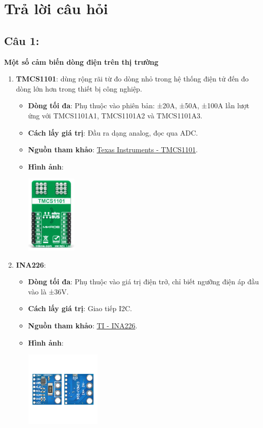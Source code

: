 \section{Trả lời câu hỏi}
\subsection{Câu 1:}
\textbf{Một số cảm biến dòng điện trên thị trường}

\begin{enumerate}
    \item \textbf{TMCS1101}: dùng rộng rãi từ đo dòng nhỏ trong hệ thống điện tử đến đo dòng lớn hơn trong thiết bị công nghiệp.
    \begin{itemize}
        \item \textbf{Dòng tối đa}: Phụ thuộc vào phiên bản: ±20A, ±50A, ±100A lần lượt ứng với TMCS1101A1, TMCS1101A2 và TMCS1101A3.
        \item \textbf{Cách lấy giá trị}: Đầu ra dạng analog, đọc qua ADC.
        \item \textbf{Nguồn tham khảo}: \href{https://www.ti.com/product/TMCS1101}{Texas Instruments - TMCS1101}.
        \item \textbf{Hình ảnh}:
        \begin{center}
            \includegraphics[width=0.2\textwidth]{graphics/section5/tmcs1101.png}
        \end{center}
    \end{itemize}

    \item \textbf{INA226}:
    \begin{itemize}
        \item \textbf{Dòng tối đa}: Phụ thuộc vào giá trị điện trở, chỉ biết ngưỡng điện áp đầu vào là ±36V.
        \item \textbf{Cách lấy giá trị}: Giao tiếp I2C.
        \item \textbf{Nguồn tham khảo}: \href{https://www.ti.com/product/INA226}{TI - INA226}.
        \item \textbf{Hình ảnh}:
        \begin{center}
            \includegraphics[width=0.3\textwidth]{graphics/section5/ina226.png}
        \end{center}
    \end{itemize}


\end{enumerate}
